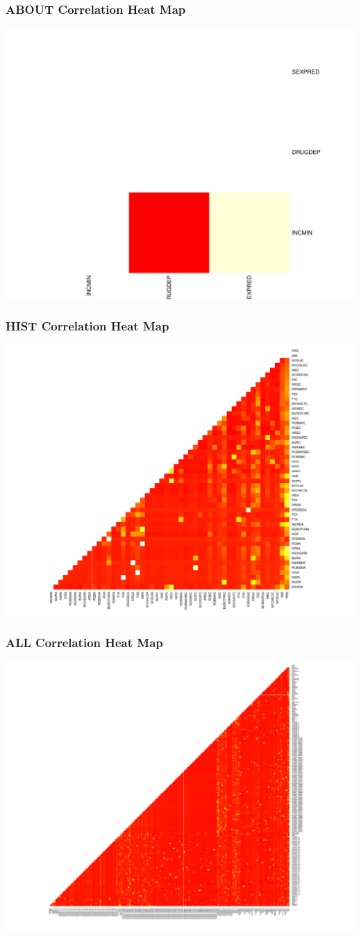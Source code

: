 \documentclass[11pt,letter]{article}
\begin{document}
\subsubsection{ABOUT Correlation Heat Map}
\includegraphics[scale=0.5]{report_figures/about.pdf}
\subsubsection{HIST Correlation Heat Map}
\includegraphics[scale=0.5]{report_figures/hist.pdf}
\subsubsection{ALL Correlation Heat Map}
\includegraphics[scale=0.5]{report_figures/all.pdf}
\end{document}
